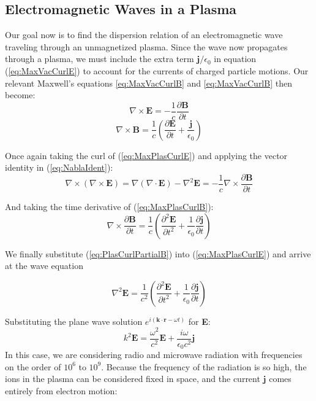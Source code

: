 \documentclass[twocolumn]{article}
\begin{document}
\subsection*{Electromagnetic Waves in a Plasma}
Our goal now is to find the dispersion relation of an electromagnetic wave traveling through an unmagnetized plasma.
Since the wave now propagates through a plasma, we must include the extra term $\mathbf{j}/\epsilon_0$ in equation (\ref{eq:MaxVacCurlE}) to account for the currents of charged particle motions.
Our relevant Maxwell's equations \ref{eq:MaxVacCurlB} and \ref{eq:MaxVacCurlB} then become:
\begin{equation}
	\label{eq:MaxPlasCurlE}
	\nabla \times \mathbf{E} = -\frac{1}{c} \frac{\partial \mathbf{B}}{\partial t}
\end{equation}
\begin{equation}
	\label{eq:MaxPlasCurlB}
	\nabla \times \mathbf{B} = \frac{1}{c} (\frac{\partial \mathbf{E}}{\partial t} + \frac{\mathbf{j}}{\epsilon_0})
\end{equation}

Once again taking the curl of (\ref{eq:MaxPlasCurlE}) and applying the vector identity in (\ref{eq:NablaIdent}):
\begin{equation}
	\nabla \times (\nabla \times \mathbf{E}) = \nabla(\nabla \cdot \mathbf{E}) - \nabla^2 \mathbf{E} = -\frac{1}{c}\nabla \times \frac{\partial \mathbf{B}}{\partial t}
\end{equation}

And taking the time derivative of (\ref{eq:MaxPlasCurlB}):
\begin{equation}
	\label{eq:PlasCurlPartialB}
	\nabla \times \frac{\partial \mathbf{B}}{\partial t} = \frac{1}{c}(\frac{\partial^2 \mathbf{E}}{\partial t^2} + \frac{1}{\epsilon_0} \frac{\partial \mathbf{j}}{\partial t})
\end{equation}

We finally substitute (\ref{eq:PlasCurlPartialB}) into (\ref{eq:MaxPlasCurlE}) and arrive at the wave equation

\begin{equation}
	\nabla^2 \mathbf{E} = \frac{1}{c^2}(\frac{\partial^2 \mathbf{E}}{\partial t^2} + \frac{1}{\epsilon_0} \frac{\partial \mathbf{j}}{\partial t})
\end{equation}

Substituting the plane wave solution $e^{i(\mathbf{k} \cdot \mathbf{r} - \omega t)}$ for \textbf{E}:
\begin{equation}
	\label{eq:PlasPlaneWave1}
	k^2\mathbf{E} = \frac{\omega^2}{c^2}\mathbf{E} + \frac{i\omega}{\epsilon_0 c^2}\mathbf{j}
\end{equation}
In this case, we are considering radio and microwave radiation with frequencies on the order of $10^6$ to $10^9$.
Because the frequency of the radiation is so high, the ions in the plasma can be considered fixed in space, and the current $\mathbf{j}$ comes entirely from electron motion:
 
\end{document}
